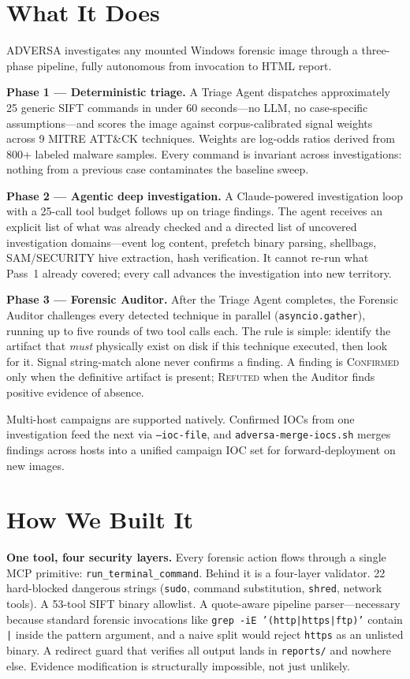\documentclass[10pt, letterpaper]{article}
\begin{document}
\section{What It Does}

ADVERSA investigates any mounted Windows forensic image through a
three-phase pipeline, fully autonomous from invocation to HTML report.

\textbf{Phase 1 — Deterministic triage.} A Triage Agent dispatches
approximately 25 generic SIFT commands in under 60 seconds---no LLM,
no case-specific assumptions---and scores the image against
corpus-calibrated signal weights across 9 MITRE ATT\&CK techniques.
Weights are log-odds ratios derived from 800+ labeled malware samples.
Every command is invariant across investigations: nothing from a previous
case contaminates the baseline sweep.

\textbf{Phase 2 — Agentic deep investigation.} A Claude-powered
investigation loop with a 25-call tool budget follows up on triage
findings. The agent receives an explicit list of what was already
checked and a directed list of uncovered investigation domains---event
log content, prefetch binary parsing, shellbags, SAM/SECURITY hive
extraction, hash verification. It cannot re-run what Pass~1 already
covered; every call advances the investigation into new territory.

\textbf{Phase 3 — Forensic Auditor.} After the Triage Agent completes,
the Forensic Auditor challenges every detected technique in parallel
(\texttt{asyncio.gather}), running up to five rounds of two tool calls
each. The rule is simple: identify the artifact that \emph{must}
physically exist on disk if this technique executed, then look for it.
Signal string-match alone never confirms a finding. A finding is
\textsc{Confirmed} only when the definitive artifact is present;
\textsc{Refuted} when the Auditor finds positive evidence of absence.

Multi-host campaigns are supported natively. Confirmed IOCs from one
investigation feed the next via \texttt{--ioc-file}, and
\texttt{adversa-merge-iocs.sh} merges findings across hosts into a
unified campaign IOC set for forward-deployment on new images.

\section{How We Built It}

\textbf{One tool, four security layers.} Every forensic action flows
through a single MCP primitive: \texttt{run\_terminal\_command}. Behind it
is a four-layer validator. 22 hard-blocked dangerous strings (\texttt{sudo},
command substitution, \texttt{shred}, network tools). A 53-tool SIFT
binary allowlist. A quote-aware pipeline parser---necessary because
standard forensic invocations like \texttt{grep -iE '(http|https|ftp)'}
contain \texttt{|} inside the pattern argument, and a naive split would
reject \texttt{https} as an unlisted binary. A redirect guard that
verifies all output lands in \texttt{reports/} and nowhere else.
Evidence modification is structurally impossible, not just unlikely.
\end{document}
